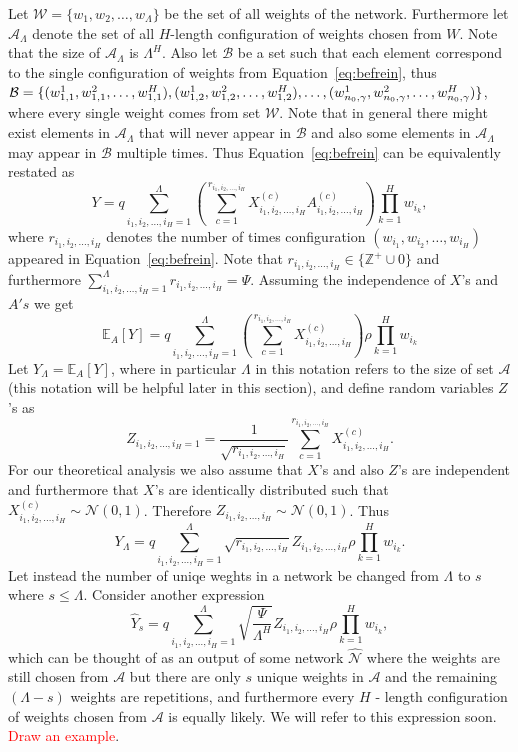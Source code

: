 \documentclass[twoside]{article}
\begin{document}
Let $\mathcal{W} = \{w_1,w_2,\dots,w_{\Lambda}\}$ be the set of all weights of the network. Furthermore let $\mathcal{A}_{\Lambda}$ denote the set of all $H$-length configuration of weights chosen from $W$. Note that the size of $\mathcal{A}_{\Lambda}$ is $\Lambda^H$. Also let $\mathcal{B}$ be a set such that each element correspond to the single configuration of weights from Equation~\ref{eq:befrein}, thus $\mathcal{B} = \{(w_{1,1}^1,w_{1,1}^2,\dots,w_{1,1}^H),(w_{1,2}^1,w_{1,2}^2,\dots,w_{1,2}^H),\dots,\\(w_{n_0,\gamma}^1,w_{n_0,\gamma}^2,\dots,w_{n_0,\gamma}^H)\}$, where every single weight comes from set $\mathcal{W}$. Note that in general there might exist elements in $\mathcal{A}_{\Lambda}$ that will never appear in $\mathcal{B}$ and also some elements in $\mathcal{A}_{\Lambda}$ may appear in $\mathcal{B}$ multiple times. Thus Equation~\ref{eq:befrein} can be equivalently restated as 
\[Y \!=\! q\!\!\!\!\sum_{i_1,i_2,\dots,i_H=1}^{\Lambda}\!\!\!\left(\sum_{c=1}^{r_{i_1,i_2,\dots,i_H}}\!\!\!X_{i_1,i_2,\dots,i_H}^{(c)}A_{i_1,i_2,\dots,i_H}^{(c)}\!\!\right)\!\!\prod_{k = 1}^{H}w_{i_k},
\]
where $r_{i_1,i_2,\dots,i_H}$ denotes the number of times configuration $(w_{i_1},w_{i_2},\dots,w_{i_H})$ appeared in Equation~\ref{eq:befrein}. Note that $r_{i_1,i_2,\dots,i_H} \in \{\mathbb{Z}^{+}\cup{0}\}$ and furthermore $\sum_{i_1,i_2,\dots,i_H=1}^{\Lambda}r_{i_1,i_2,\dots,i_H} = \Psi$. Assuming the independence of $X$'s and $A's$ we get
\[\mathbb{E}_A[Y] = q\!\!\sum_{i_1,i_2,\dots,i_H=1}^{\Lambda}\left(\sum_{c=1}^{r_{i_1,i_2,\dots,i_H}}X_{i_1,i_2,\dots,i_H}^{(c)}\right)\rho\prod_{k = 1}^{H}w_{i_k}
\]
Let $Y_{\Lambda} = \mathbb{E}_A[Y]$, where in particular $\Lambda$ in this notation refers to the size of set $\mathcal{A}$ (this notation will be helpful later in this section), and define random variables $Z$'s as
\[Z_{i_1,i_2,\dots,i_H=1} = \frac{1}{\sqrt{r_{i_1,i_2,\dots,i_H}}}\sum_{c=1}^{r_{i_1,i_2,\dots,i_H}}X_{i_1,i_2,\dots,i_H}^{(c)}.
\]
For our theoretical analysis we also assume that $X$'s and also $Z$'s are independent and furthermore that $X$'s are identically distributed such that $X_{i_1,i_2,\dots,i_H}^{(c)}\sim\mathcal{N}(0,1)$. Therefore $Z_{i_1,i_2,\dots,i_H}\sim\mathcal{N}(0,1)$. Thus 
\begin{equation}
Y_{\Lambda}= q\!\!\!\sum_{i_1,i_2,\dots,i_H=1}^{\Lambda}\sqrt{r_{i_1,i_2,\dots,i_H}}Z_{i_1,i_2,\dots,i_H}\rho\prod_{k = 1}^{H}w_{i_k}.
\label{eq:befapprox}
\end{equation}
Let instead the number of uniqe weghts in a network be changed from $\Lambda$ to $s$ where $s \leq \Lambda$. Consider another expression
\begin{equation}
\hat{Y}_s = q\sum_{i_1,i_2,\dots,i_H=1}^{\Lambda}\sqrt{\frac{\Psi}{\Lambda^H}}Z_{i_1,i_2,\dots,i_H}\rho\prod_{k = 1}^{H}w_{i_k},
\label{eq:approx}
\end{equation}
which can be thought of as an output of some network $\hat{\mathcal{N}}$ where the weights are still chosen from $\mathcal{A}$ but there are only $s$ unique weights in $\mathcal{A}$ and the remaining $(\Lambda-s)$ weights are repetitions, and furthermore every $H$ - length configuration of weights chosen from $\mathcal{A}$ is equally likely. We will refer to this expression soon. \textcolor{red}{Draw an example}.
\end{document}
